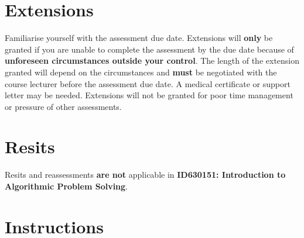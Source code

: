 \documentclass{article}
\begin{document}
\section*{Extensions}
Familiarise yourself with the assessment due date. Extensions will \textbf{only} be granted if you are unable to complete the assessment by the due date because of \textbf{unforeseen circumstances outside your control}. The length of the extension granted will depend on the circumstances and \textbf{must} be negotiated with the course lecturer before the assessment due date. A medical certificate or support letter may be needed. Extensions will not be granted for poor time management or pressure of other assessments.

\section*{Resits}
Resits and reassessments \textbf{are not} applicable in \textbf{ID630151: Introduction to Algorithmic Problem Solving}.

\section*{Instructions}
\end{document}
